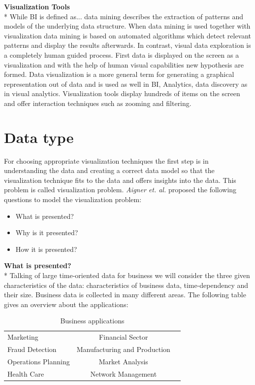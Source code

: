 \textbf{Visualization Tools}\\*
While BI is defined as... data mining describes the extraction of patterns and models of the underlying data structure\cite{FerreiradeOliveira2003}. When data mining is used together with visualization data mining is based on automated algorithms which detect relevant patterns and display the results afterwards. In contrast, visual data exploration is a completely human guided process\cite{FerreiradeOliveira2003}. First data is displayed on the screen as a visualization and with the help of human visual capabilities new hypothesis are formed. Data visualization is a more general term for generating a graphical representation out of data and is used as well in BI, Analytics, data discovery as in visual analytics. 
Visualization tools display hundreds of items on the screen and offer interaction techniques such as zooming and filtering\cite{Shneiderman2008}.


\section{Data type}
For choosing appropriate visualization techniques the first step is in understanding the data  and creating a correct data model\cite{Aigner2011} so that the visualization technique fits to the data and offers insights\cite{Bacic} into the data. This problem is called visualization problem. \textit{Aigner et. al.} proposed  the following questions to model the visualization problem: 
\begin{itemize}
    \item What is presented?
    \item Why is it presented?
    \item How it is presented?
\end{itemize}
\textbf{What is presented?}\\*
Talking of large time-oriented data for business we will consider the three given characteristics of the data: characteristics of business data, time-dependency and their size. Business data is collected in many different areas. The following table gives an overview about the applications: 

\begin{table}[th]
	\centering
	\caption[Table 1]{Business applications\cite{Brachman1996,Tegarden1999}}
	\label{businessapplications}
	\begin{tabu}{lcc}
	\toprule
	Marketing & Financial Sector \\
	Fraud Detection & Manufacturing and Production \\
	Operations Planning & Market Analysis \\
	Health Care & Network Management\\
	\bottomrule
	\end{tabu}
\end{table}

